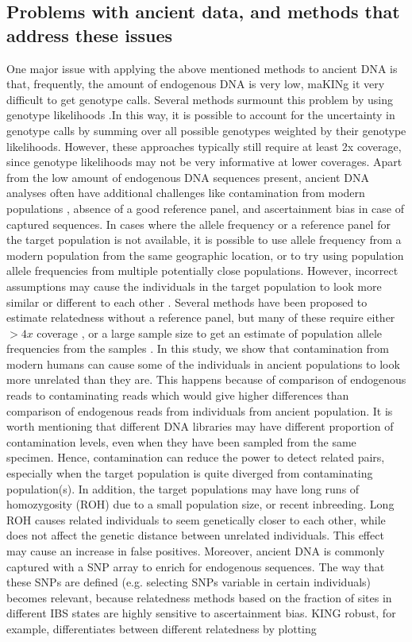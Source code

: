 \documentclass[12pt, letterpaper]{article}
\begin{document}
\subsection{Problems with ancient data, and methods that address these issues}
One major issue with applying the above mentioned methods to ancient DNA is that, frequently, the amount of endogenous DNA is very low, maKINg it very difficult to get genotype calls.
Several methods surmount this problem by using genotype likelihoods \cite{lipatov_maximum_2015,korneliussen_ngsrelate_2015}.In this way, it is possible to account for the uncertainty in genotype calls by summing over all possible genotypes weighted by their genotype likelihoods. However, these approaches typically still require at least 2x coverage, since genotype likelihoods may not be very informative at lower coverages. Apart from the low amount of endogenous DNA sequences present, ancient DNA analyses often have additional challenges like contamination from modern populations \cite{peyregne_authentict_2020}, absence of a good reference panel, and ascertainment bias in case of captured sequences. In cases where the allele frequency or a reference panel for the target population is not available, it is possible to use allele frequency from a modern population from the same geographic location, or to try using population allele frequencies from multiple potentially close populations. However, incorrect assumptions may cause the individuals in the target population to look more similar or different to each other \cite{amorim_understanding_2018}. Several methods have been proposed to estimate relatedness without a reference panel, but many of these require either $>4x$ coverage \cite{waples_allele_2019}, or a large sample size to get an estimate of population allele frequencies from the samples \cite{theunert_joint_2017}. In this study, we show that contamination from modern humans can cause some of the individuals in ancient populations to look more unrelated than they are. This happens because of comparison of endogenous reads to contaminating reads which would give higher differences than comparison of endogenous reads from individuals from ancient population. It is worth mentioning that different DNA libraries may have different proportion of contamination levels, even when they have been sampled from the same specimen. Hence, contamination can reduce the power to detect related pairs, especially when the target population is quite diverged from contaminating population(s). In addition, the target populations may have long runs of homozygosity (ROH) due to a small population size, or recent inbreeding. Long ROH causes related individuals to seem genetically closer to each other, while does not affect the genetic distance between unrelated individuals. This effect may cause an increase in false positives. Moreover, ancient DNA is commonly captured with a SNP array to enrich for endogenous sequences. The way that these SNPs are defined (e.g. selecting SNPs variable in certain individuals) becomes relevant, because relatedness methods based on the fraction of sites in different IBS states are highly sensitive to ascertainment bias. KING robust, for example, differentiates between different relatedness by plotting 
\end{document}
